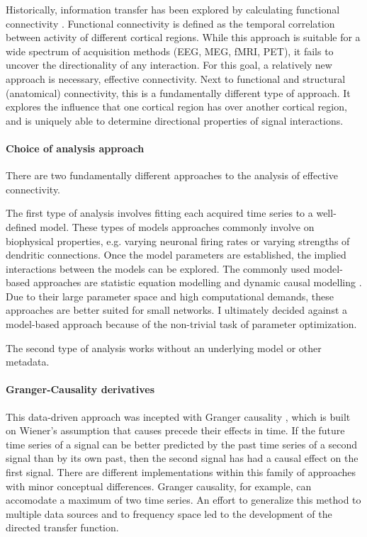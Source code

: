 Historically, information transfer has been explored by calculating functional connectivity \cite{1.5.connectivity}.
Functional connectivity is defined as the temporal correlation between activity of different cortical regions.
While this approach is suitable for a wide spectrum of acquisition methods (EEG, MEG, fMRI, PET), it fails to uncover the directionality of any interaction.
For this goal, a relatively new approach is necessary, effective connectivity.
Next to functional and structural (anatomical) connectivity, this is a fundamentally different type of approach.
It explores the influence that one cortical region has over another cortical region, and is uniquely able to determine directional properties of signal interactions.

\paragraph{Choice of analysis approach}
There are two fundamentally different approaches to the analysis of effective connectivity.

The first type of analysis involves fitting each acquired time series to a well-defined model.
These types of models approaches commonly involve on biophysical properties, e.g. varying neuronal firing rates or varying strengths of dendritic connections.
Once the model parameters are established, the implied interactions between the models can be explored.
The commonly used model-based approaches are statistic equation modelling \cite{1.5.SEM} and dynamic causal modelling \cite{1.5.DCM}.
Due to their large parameter space and high computational demands, these approaches are better suited for small networks.
I ultimately decided against a model-based approach because of the non-trivial task of parameter optimization.

The second type of analysis works without an underlying model or other metadata.

\paragraph{Granger-Causality derivatives}
This data-driven approach was incepted with Granger causality \cite{1.5.Granger}, which is built on Wiener's assumption that causes precede their effects in time.
If the future time series of a signal can be better predicted by the past time series of a second signal than by its own past, then the second signal has had a causal effect on the first signal.
There are different implementations within this family of approaches with minor conceptual differences.
Granger causality, for example, can accomodate a maximum of two time series.
An effort to generalize this method to multiple data sources and to frequency space led to the development of the directed transfer function.


